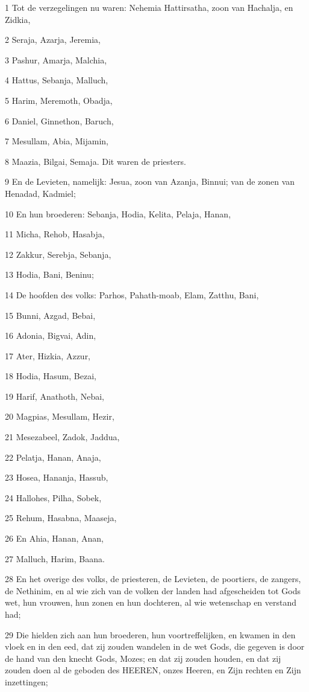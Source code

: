 \par 1 Tot de verzegelingen nu waren: Nehemia Hattirsatha, zoon van Hachalja, en Zidkia,
\par 2 Seraja, Azarja, Jeremia,
\par 3 Pashur, Amarja, Malchia,
\par 4 Hattus, Sebanja, Malluch,
\par 5 Harim, Meremoth, Obadja,
\par 6 Daniel, Ginnethon, Baruch,
\par 7 Mesullam, Abia, Mijamin,
\par 8 Maazia, Bilgai, Semaja. Dit waren de priesters.
\par 9 En de Levieten, namelijk: Jesua, zoon van Azanja, Binnui; van de zonen van Henadad, Kadmiel;
\par 10 En hun broederen: Sebanja, Hodia, Kelita, Pelaja, Hanan,
\par 11 Micha, Rehob, Hasabja,
\par 12 Zakkur, Serebja, Sebanja,
\par 13 Hodia, Bani, Beninu;
\par 14 De hoofden des volks: Parhos, Pahath-moab, Elam, Zatthu, Bani,
\par 15 Bunni, Azgad, Bebai,
\par 16 Adonia, Bigvai, Adin,
\par 17 Ater, Hizkia, Azzur,
\par 18 Hodia, Hasum, Bezai,
\par 19 Harif, Anathoth, Nebai,
\par 20 Magpias, Mesullam, Hezir,
\par 21 Mesezabeel, Zadok, Jaddua,
\par 22 Pelatja, Hanan, Anaja,
\par 23 Hosea, Hananja, Hassub,
\par 24 Hallohes, Pilha, Sobek,
\par 25 Rehum, Hasabna, Maaseja,
\par 26 En Ahia, Hanan, Anan,
\par 27 Malluch, Harim, Baana.
\par 28 En het overige des volks, de priesteren, de Levieten, de poortiers, de zangers, de Nethinim, en al wie zich van de volken der landen had afgescheiden tot Gods wet, hun vrouwen, hun zonen en hun dochteren, al wie wetenschap en verstand had;
\par 29 Die hielden zich aan hun broederen, hun voortreffelijken, en kwamen in den vloek en in den eed, dat zij zouden wandelen in de wet Gods, die gegeven is door de hand van den knecht Gods, Mozes; en dat zij zouden houden, en dat zij zouden doen al de geboden des HEEREN, onzes Heeren, en Zijn rechten en Zijn inzettingen;
